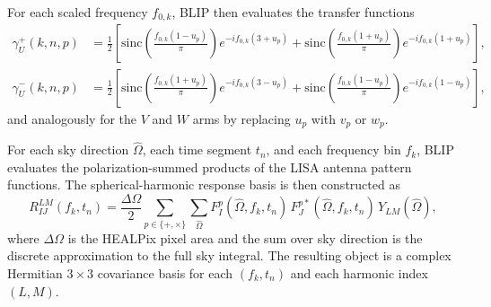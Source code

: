 \documentclass[11pt]{article}
\begin{document}
For each scaled frequency $f_{0,k}$, BLIP then evaluates the transfer functions
\begin{align}
\gamma^{+}_{U}(k,n,p)
&=\frac{1}{2}\left[
\mathrm{sinc}\!\left(\frac{f_{0,k}(1-u_p)}{\pi}\right)e^{-if_{0,k}(3+u_p)}
+\mathrm{sinc}\!\left(\frac{f_{0,k}(1+u_p)}{\pi}\right)e^{-if_{0,k}(1+u_p)}
\right], \\
\gamma^{-}_{U}(k,n,p)
&=\frac{1}{2}\left[
\mathrm{sinc}\!\left(\frac{f_{0,k}(1+u_p)}{\pi}\right)e^{-if_{0,k}(3-u_p)}
+\mathrm{sinc}\!\left(\frac{f_{0,k}(1-u_p)}{\pi}\right)e^{-if_{0,k}(1-u_p)}
\right],
\end{align}
and analogously for the $V$ and $W$ arms by replacing $u_p$ with $v_p$ or $w_p$.

For each sky direction $\hat{\Omega}$, each time segment $t_n$, and each frequency bin $f_k$, BLIP evaluates the polarization-summed products of the LISA antenna pattern functions. The spherical-harmonic response basis is then constructed as
\begin{equation}
R_{IJ}^{LM}(f_k,t_n)
=\frac{\Delta\Omega}{2}\sum_{p\in\{+,\times\}}
\sum_{\hat{\Omega}}
F_I^{p}(\hat{\Omega},f_k,t_n)\,
F_J^{p\ast}(\hat{\Omega},f_k,t_n)\,
Y_{LM}(\hat{\Omega}),
\end{equation}
where $\Delta\Omega$ is the HEALPix pixel area and the sum over sky direction is the discrete approximation to the full sky integral. The resulting object is a complex Hermitian $3\times3$ covariance basis for each $(f_k,t_n)$ and each harmonic index $(L,M)$.
\end{document}
